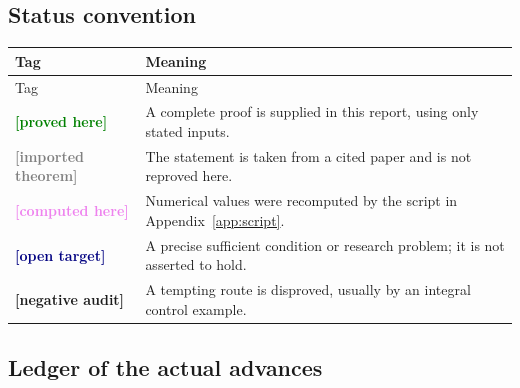 \documentclass[11pt,oneside]{article}
\theoremstyle{definition}
\theoremstyle{remark}
\newcommand{\statusproved}{\textcolor{green}{\textbf{[proved here]}}}
\newcommand{\statusimported}{\textcolor{gray}{\textbf{[imported theorem]}}}
\newcommand{\statuscomputed}{\textcolor{violet}{\textbf{[computed here]}}}
\newcommand{\statustarget}{\textcolor{navy}{\textbf{[open target]}}}
\newcommand{\statusnegative}{\textcolor{brick}{\textbf{[negative audit]}}}
\begin{document}
\subsection{Status convention}

\begin{longtable}{L{0.18\textwidth}L{0.75\textwidth}}
\toprule
Tag & Meaning \\
\midrule
\endfirsthead
\toprule
Tag & Meaning \\
\midrule
\endhead
\statusproved & A complete proof is supplied in this report, using only stated inputs. \\
\statusimported & The statement is taken from a cited paper and is not reproved here. \\
\statuscomputed & Numerical values were recomputed by the script in Appendix~\ref{app:script}. \\
\statustarget & A precise sufficient condition or research problem; it is not asserted to hold. \\
\statusnegative & A tempting route is disproved, usually by an integral control example. \\
\bottomrule
\end{longtable}

\subsection{Ledger of the actual advances}
\end{document}
